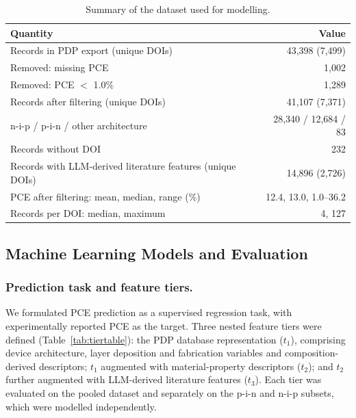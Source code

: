 \documentclass[3p]{elsarticle}
\begin{document}
\begin{table}[t]
\centering\small
\caption{Summary of the dataset used for modelling.}
\label{tab:dataset}
\begin{tabular}{lr}
\toprule
Quantity & Value \\
\midrule
Records in PDP export (unique DOIs) & 43,398 (7,499) \\
Removed: missing PCE & 1,002 \\
Removed: PCE $<$ 1.0\% & 1,289 \\
Records after filtering (unique DOIs) & 41,107 (7,371) \\
\quad n-i-p / p-i-n / other architecture & 28,340 / 12,684 / 83 \\
\quad Records without DOI & 232 \\
Records with LLM-derived literature features (unique DOIs) & 14,896 (2,726) \\
PCE after filtering: mean, median, range (\%) & 12.4, 13.0, 1.0--36.2 \\
Records per DOI: median, maximum & 4, 127 \\
\bottomrule
\end{tabular}
\end{table}

\subsection{Machine Learning Models and Evaluation}

\subsubsection{Prediction task and feature tiers.}
\label{sec:tiers}
We formulated PCE prediction as a supervised regression task, with experimentally reported PCE as the target. Three nested feature tiers were defined (Table~\ref{tab:tiertable}): the PDP database representation ($t_1$), comprising device architecture, layer deposition and fabrication variables and composition-derived descriptors; $t_1$ augmented with material-property descriptors ($t_2$); and $t_2$ further augmented with LLM-derived literature features ($t_3$). Each tier was evaluated on the pooled dataset and separately on the p-i-n and n-i-p subsets, which were modelled independently.
\end{document}
